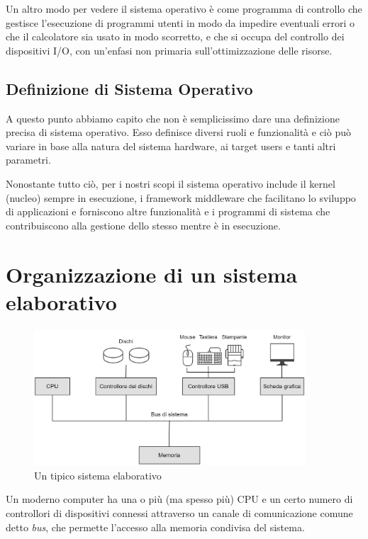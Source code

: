         Un altro modo per vedere il sistema operativo è come programma di controllo che gestisce l'esecuzione di programmi utenti in modo da impedire eventuali errori o che il calcolatore sia usato in modo scorretto, e che si occupa del controllo dei dispositivi I/O, con un'enfasi non primaria sull'ottimizzazione delle risorse.
        
    \subsection{Definizione di Sistema Operativo}
        A questo punto abbiamo capito che non è semplicissimo dare una definizione precisa di sistema operativo. Esso definisce diversi ruoli e funzionalità e ciò può variare in base alla natura del sistema hardware, ai target users e tanti altri parametri.
        
        Nonostante tutto ciò, per i nostri scopi il sistema operativo include il kernel (nucleo) sempre in esecuzione, i framework middleware che facilitano lo sviluppo di applicazioni e forniscono altre funzionalità e i programmi di sistema che contribuiscono alla gestione dello stesso mentre è in esecuzione.
        
\newpage
\section{Organizzazione di un sistema elaborativo}
    \begin{figure}[h]
        \centering
        \includegraphics[width=0.9\textwidth]{img/img2.png}
        \caption{Un tipico sistema elaborativo}
        \label{fig:img2}
    \end{figure}
    
    Un moderno computer ha una o più (ma spesso più) CPU e un certo numero di controllori di dispositivi connessi attraverso un canale di comunicazione comune detto \textit{bus}, che permette l'accesso alla memoria condivisa del sistema.
    
